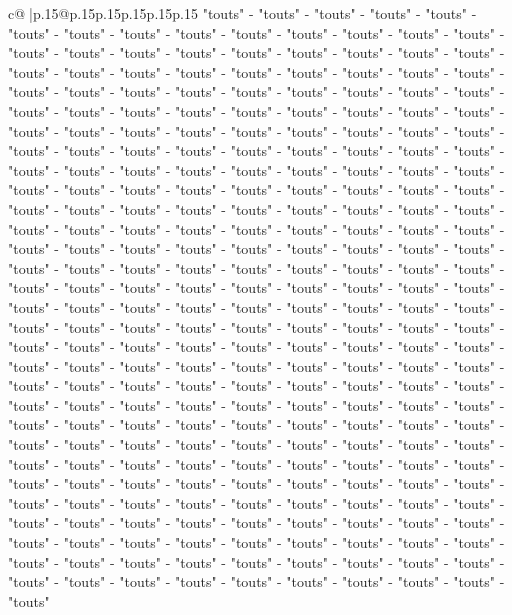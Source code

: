 \documentclass{article}
\begin{document}
{\begin{supertabular}{c@{$\;$}|p{.15\linewidth}@{}p{.15\linewidth}p{.15\linewidth}p{.15\linewidth}p{.15\linewidth}p{.15\linewidth}}
{{{"touts" {-} "touts" {-} "touts" {-} "touts" {-} "touts" {-} "touts" {-} "touts" {-} "touts" {-} "touts" {-} "touts" {-} "touts" {-} "touts" {-} "touts" {-} "touts" {-} "touts" {-} "touts" {-} "touts" {-} "touts" {-} "touts" {-} "touts" {-} "touts" {-} "touts" {-} "touts" {-} "touts" {-} "touts" {-} "touts" {-} "touts" {-} "touts" {-} "touts" {-} "touts" {-} "touts" {-} "touts" {-} "touts" {-} "touts" {-} "touts" {-} "touts" {-} "touts" {-} "touts" {-} "touts" {-} "touts" {-} "touts" {-} "touts" {-} "touts" {-} "touts" {-} "touts" {-} "touts" {-} "touts" {-} "touts" {-} "touts" {-} "touts" {-} "touts" {-} "touts" {-} "touts" {-} "touts" {-} "touts" {-} "touts" {-} "touts" {-} "touts" {-} "touts" {-} "touts" {-} "touts" {-} "touts" {-} "touts" {-} "touts" {-} "touts" {-} "touts" {-} "touts" {-} "touts" {-} "touts" {-} "touts" {-} "touts" {-} "touts" {-} "touts" {-} "touts" {-} "touts" {-} "touts" {-} "touts" {-} "touts" {-} "touts" {-} "touts" {-} "touts" {-} "touts" {-} "touts" {-} "touts" {-} "touts" {-} "touts" {-} "touts" {-} "touts" {-} "touts" {-} "touts" {-} "touts" {-} "touts" {-} "touts" {-} "touts" {-} "touts" {-} "touts" {-} "touts" {-} "touts" {-} "touts" {-} "touts" {-} "touts" {-} "touts" {-} "touts" {-} "touts" {-} "touts" {-} "touts" {-} "touts" {-} "touts" {-} "touts" {-} "touts" {-} "touts" {-} "touts" {-} "touts" {-} "touts" {-} "touts" {-} "touts" {-} "touts" {-} "touts" {-} "touts" {-} "touts" {-} "touts" {-} "touts" {-} "touts" {-} "touts" {-} "touts" {-} "touts" {-} "touts" {-} "touts" {-} "touts" {-} "touts" {-} "touts" {-} "touts" {-} "touts" {-} "touts" {-} "touts" {-} "touts" {-} "touts" {-} "touts" {-} "touts" {-} "touts" {-} "touts" {-} "touts" {-} "touts" {-} "touts" {-} "touts" {-} "touts" {-} "touts" {-} "touts" {-} "touts" {-} "touts" {-} "touts" {-} "touts" {-} "touts" {-} "touts" {-} "touts" {-} "touts" {-} "touts" {-} "touts" {-} "touts" {-} "touts" {-} "touts" {-} "touts" {-} "touts" {-} "touts" {-} "touts" {-} "touts" {-} "touts" {-} "touts" {-} "touts" {-} "touts" {-} "touts" {-} "touts" {-} "touts" {-} "touts" {-} "touts" {-} "touts" {-} "touts" {-} "touts" {-} "touts" {-} "touts" {-} "touts" {-} "touts" {-} "touts" {-} "touts" {-} "touts" {-} "touts" {-} "touts" {-} "touts" {-} "touts" {-} "touts" {-} "touts" {-} "touts" {-} "touts" {-} "touts" {-} "touts" {-} "touts" {-} "touts" {-} "touts" {-} "touts" {-} "touts" {-} "touts" {-} "touts" {-} "touts" {-} "touts" {-} "touts" {-} "touts" {-} "touts" {-} "touts" {-} "touts" {-} "touts" {-} "touts" {-} "touts" {-} "touts" {-} "touts" {-} "touts" {-} "touts" {-} "touts" {-} "touts" {-} "touts" {-} "touts" {-} "touts" {-} "touts" {-} "touts" {-} "touts" {-} "touts" {-} "touts" {-} "touts" {-} "touts" {-} "touts" {-} "touts" {-} "touts" {-} "touts" {-} "touts" {-} "touts" {-} "touts" {-} "touts" {-} "touts" {-} "touts" {-} "touts" {-} "touts" {-} "touts" {-} "touts" {-} "touts" {-} "touts" {-} "touts" {-} "touts" {-} "touts" {-} "touts" {-} "touts" {-} "touts" {-} "touts" {-} "touts" {-} "touts" {-} "touts" {-} "touts" {-} "touts" {-} "touts" {-} "touts" {-} "touts" {-} "touts" {-} "touts" {-} "touts" {-} "touts" {-} "touts" {-} "touts" {-} "touts" {-} "touts" }}}
\end{supertabular}}
\end{document}

